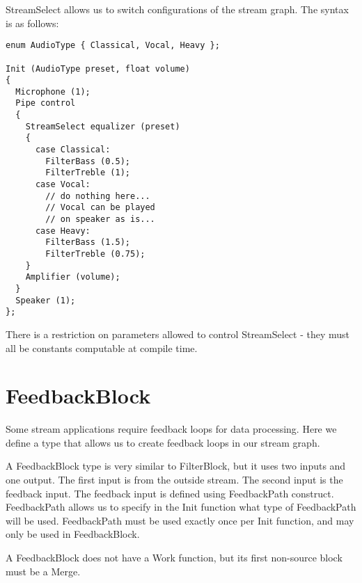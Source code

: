 \documentclass[twocolumn, draft]{article}
\begin{document}
StreamSelect allows us to switch configurations of the stream graph.
The syntax is as follows:

\begin{verbatim}
enum AudioType { Classical, Vocal, Heavy };

Init (AudioType preset, float volume)
{
  Microphone (1);
  Pipe control
  {
    StreamSelect equalizer (preset)
    {
      case Classical:
        FilterBass (0.5);
        FilterTreble (1);
      case Vocal:
        // do nothing here...
        // Vocal can be played 
        // on speaker as is...
      case Heavy:
        FilterBass (1.5);
        FilterTreble (0.75);
    }
    Amplifier (volume);
  }
  Speaker (1);
};
\end{verbatim}

There is a restriction on parameters allowed to control StreamSelect - they
must all be constants computable at compile time.

\section{FeedbackBlock}

Some stream applications require feedback loops for data processing.
Here we define a type that allows us to create feedback loops
in our stream graph.

A FeedbackBlock type is very similar to FilterBlock, but it uses two inputs 
and one output.  The first input
is from the outside stream.  The second input is the feedback input.
The feedback input is defined using FeedbackPath construct.  FeedbackPath
allows us to specify in the Init function what type of FeedbackPath will
be used.  FeedbackPath must be used exactly once per Init function, and
may only be used in FeedbackBlock.

A FeedbackBlock does not have a Work function, but its first non-source
block must be a Merge.
\end{document}
